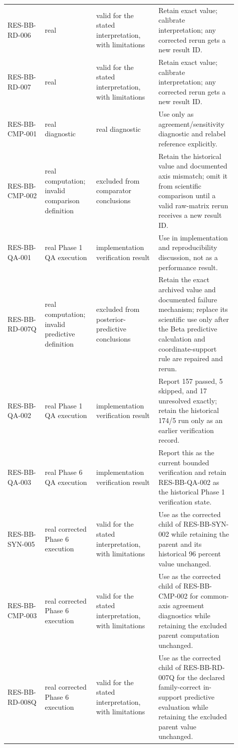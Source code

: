 \begin{longtable}{@{}p{0.15\linewidth}p{0.20\linewidth}p{0.25\linewidth}p{0.31\linewidth}@{}}
RES-BB-RD-006 & real & valid for the stated interpretation, with limitations & Retain exact value; calibrate interpretation; any corrected rerun gets a new result ID. \\
RES-BB-RD-007 & real & valid for the stated interpretation, with limitations & Retain exact value; calibrate interpretation; any corrected rerun gets a new result ID. \\
RES-BB-CMP-001 & real diagnostic & real diagnostic & Use only as agreement/sensitivity diagnostic and relabel reference explicitly. \\
RES-BB-CMP-002 & real computation; invalid comparison definition & excluded from comparator conclusions & Retain the historical value and documented axis mismatch; omit it from scientific comparison until a valid raw-matrix rerun receives a new result ID. \\
RES-BB-QA-001 & real Phase 1 QA execution & implementation verification result & Use in implementation and reproducibility discussion, not as a performance result. \\
RES-BB-RD-007Q & real computation; invalid predictive definition & excluded from posterior-predictive conclusions & Retain the exact archived value and documented failure mechanism; replace its scientific use only after the Beta predictive calculation and coordinate-support rule are repaired and rerun. \\
RES-BB-QA-002 & real Phase 1 QA execution & implementation verification result & Report 157 passed, 5 skipped, and 17 unresolved exactly; retain the historical 174/5 run only as an earlier verification record. \\
RES-BB-QA-003 & real Phase 6 QA execution & implementation verification result & Report this as the current bounded verification and retain RES-BB-QA-002 as the historical Phase 1 verification state. \\
RES-BB-SYN-005 & real corrected Phase 6 execution & valid for the stated interpretation, with limitations & Use as the corrected child of RES-BB-SYN-002 while retaining the parent and its historical 96 percent value unchanged. \\
RES-BB-CMP-003 & real corrected Phase 6 execution & valid for the stated interpretation, with limitations & Use as the corrected child of RES-BB-CMP-002 for common-axis agreement diagnostics while retaining the excluded parent computation unchanged. \\
RES-BB-RD-008Q & real corrected Phase 6 execution & valid for the stated interpretation, with limitations & Use as the corrected child of RES-BB-RD-007Q for the declared family-correct in-support predictive evaluation while retaining the excluded parent value unchanged. \\
\bottomrule
\end{longtable}
\normalsize

